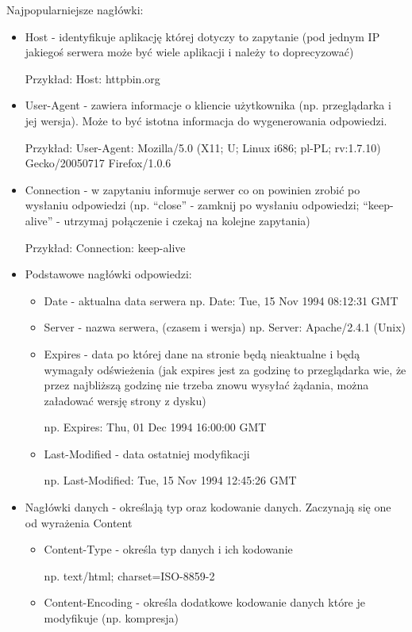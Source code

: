 \documentclass[a4paper,12pt,oneside]{book}
\begin{document}
				Najpopularniejsze nagłówki:
				\begin{itemize}
					\item Host - identyfikuje aplikację której dotyczy to zapytanie (pod jednym IP jakiegoś
					serwera może być wiele aplikacji i należy to doprecyzować)
					
					Przykład: Host: httpbin.org
					\item User-Agent - zawiera informacje o kliencie użytkownika (np. przeglądarka i jej
					wersja). Może to być istotna informacja do wygenerowania odpowiedzi.
					
					Przykład: User-Agent: Mozilla/5.0 (X11; U; Linux i686; pl-PL; rv:1.7.10) Gecko/20050717 Firefox/1.0.6
					\item Connection - w zapytaniu informuje serwer co on powinien zrobić po wysłaniu
					odpowiedzi (np. “close” - zamknij po wysłaniu odpowiedzi; “keep-alive” - utrzymaj
					połączenie i czekaj na kolejne zapytania)
					
					Przykład: Connection: keep-alive
					\item Podstawowe nagłówki odpowiedzi:
					\begin{itemize}
						\item Date - aktualna data serwera np. Date: Tue, 15 Nov 1994 08:12:31 GMT
						\item Server - nazwa serwera, (czasem i wersja) np. Server: Apache/2.4.1 (Unix)
						\item Expires - data po której dane na stronie będą nieaktualne i będą wymagały
						odświeżenia (jak expires jest za godzinę to przeglądarka wie, że przez
						najbliższą godzinę nie trzeba znowu wysyłać żądania, można załadować
						wersję strony z dysku) 
						
						np. Expires: Thu, 01 Dec 1994 16:00:00 GMT
						\item Last-Modified - data ostatniej modyfikacji 
						
						np.	Last-Modified: Tue, 15 Nov 1994 12:45:26 GMT
					\end{itemize}
					\item Nagłówki danych - określają typ oraz kodowanie danych. Zaczynają się one od
					wyrażenia Content
						\begin{itemize}
							\item Content-Type - określa typ danych i ich kodowanie 
							
							np. text/html; charset=ISO-8859-2
							\item Content-Encoding - określa dodatkowe kodowanie danych które je
							modyfikuje (np. kompresja) 
							

\end{itemize}
\end{itemize}
\end{document}
